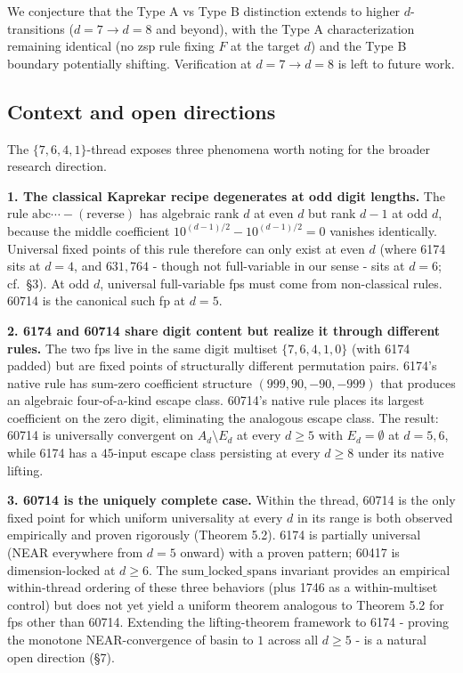 \documentclass[11pt,letterpaper]{article}
\theoremstyle{paperstyle}
\theoremstyle{paperstyledef}
\theoremstyle{paperstylerem}
\begin{document}
We conjecture that the Type A vs Type B distinction extends to higher
\(d\)-transitions (\(d = 7 \to d = 8\) and beyond), with the Type A
characterization remaining identical (no zsp rule fixing \(F\) at the
target \(d\)) and the Type B boundary potentially shifting. Verification
at \(d = 7 \to d = 8\) is left to future work.

\hypertarget{context-and-open-directions}{%
\subsection{Context and open directions}\label{context-and-open-directions}}

The \(\{7, 6, 4, 1\}\)-thread exposes three phenomena worth noting for
the broader research direction.

\textbf{1. The classical Kaprekar recipe degenerates at odd digit
lengths.} The rule \(\mathrm{abc \cdots} - (\text{reverse})\) has
algebraic rank \(d\) at even \(d\) but rank \(d - 1\) at odd \(d\),
because the middle coefficient \(10^{(d-1)/2} - 10^{(d-1)/2} = 0\)
vanishes identically. Universal fixed points of this rule therefore can
only exist at even \(d\) (where 6174 sits at \(d = 4\), and
\(631{,}764\) - though not full-variable in our sense - sits at
\(d = 6\); cf.~§3). At odd \(d\), universal full-variable fps must come
from non-classical rules. 60714 is the canonical such fp at \(d = 5\).

\textbf{2. 6174 and 60714 share digit content but realize it through
different rules.} The two fps live in the same digit multiset
\(\{7, 6, 4, 1, 0\}\) (with 6174 padded) but are fixed points of
structurally different permutation pairs. 6174's native rule has
sum-zero coefficient structure \((999, 90, -90, -999)\) that produces an
algebraic four-of-a-kind escape class. 60714's native rule places its
largest coefficient on the zero digit, eliminating the analogous escape
class. The result: 60714 is universally convergent on
\(A_d \setminus E_d\) at every \(d \geq 5\) with \(E_d = \emptyset\) at
\(d = 5, 6\), while 6174 has a \(45\)-input escape class persisting at
every \(d \geq 8\) under its native lifting.

\textbf{3. 60714 is the uniquely complete case.} Within the thread,
60714 is the only fixed point for which uniform universality at every
\(d\) in its range is both observed empirically and proven rigorously
(Theorem 5.2). 6174 is partially universal (NEAR everywhere from
\(d = 5\) onward) with a proven pattern; 60417 is dimension-locked at
\(d \geq 6\). The \(\mathrm{sum\_locked\_spans}\) invariant provides an
empirical within-thread ordering of these three behaviors (plus 1746 as
a within-multiset control) but does not yet yield a uniform theorem
analogous to Theorem 5.2 for fps other than 60714. Extending the
lifting-theorem framework to 6174 - proving the monotone
NEAR-convergence of basin to \(1\) across all \(d \geq 5\) - is a
natural open direction (§7).
\end{document}

